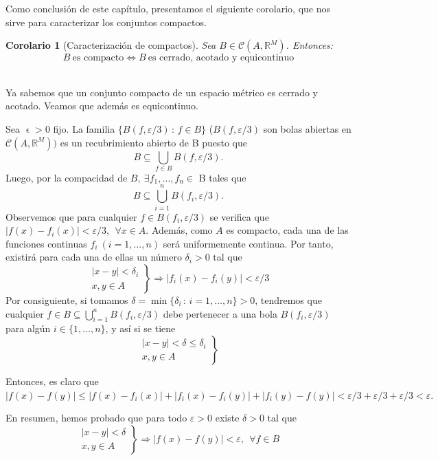 \documentclass[11pt, a4paper]{article}
\makeatletter
\newif\IfInSansMode
\let\oldsf\sffamily
\renewcommand*{\sffamily}{\oldsf\mathversion{sans}\InSansModetrue}
\let\oldnorm\normalfont
\renewcommand*{\normalfont}{\oldnorm\InSansModefalse\mathversion{normal}}
\let\epsilon\upvarepsilon
\renewenvironment{proof}[1][\proofname] {\par\pushQED{\qed}\normalfont\topsep6\p@\@plus6\p@\relax\trivlist\item[\hskip\labelsep\itshape\sffamily#1\@addpunct{.}]\ignorespaces}{\popQED\endtrivlist\@endpefalse}
\theoremstyle{theorem-style}
\newtheorem{ncor}{Corolario}[section]
\theoremstyle{definition-style}
\theoremstyle{remark-style}
\theoremstyle{example-style}
\makeatother
\begin{document}
Como conclusión de este capítulo, presentamos el siguiente corolario, que nos sirve para caracterizar los conjuntos compactos.

\begin{ncor}[Caracterización de compactos] Sea $B \in \mathcal{C}(A,\mathbb{R}^M)$. Entonces: $$B\ \text{es compacto} \iff B \ \text{es cerrado, acotado y equicontinuo}$$
\end{ncor}

  \begin{proof} \hfill \\
    \boxed{\Rightarrow} Ya sabemos que un conjunto compacto de un espacio métrico es cerrado y acotado. Veamos que además es equicontinuo.
    
    Sea $\epsilon >0$ fijo. La familia $\{ B(f, \varepsilon/3) \, : \, f\in B\}$ ($B(f, \varepsilon/3)$ son bolas abiertas en $\mathcal{C}(A, \mathbb{R}^M))$ es un recubrimiento abierto de B puesto que $$B\subseteq \bigcup_{f\in B} B(f, \varepsilon/3).$$
    Luego, por la compacidad de $B,\ \exists f_1, \dots, f_n \in$ B tales que $$B \subseteq \displaystyle \bigcup_{i=1}^n B(f_i, \varepsilon/3).$$
    Observemos que para cualquier $f\in B(f_i, \varepsilon/3)$ se verifica que
    $|f(x)-f_i(x)| < \varepsilon/3 , \ \ \forall x\in A$. Además, como $A$ es compacto, cada una de las funciones continuas $f_i \ (i=1,\dots,n)$ será uniformemente continua. Por tanto, existirá para cada una de ellas un número $\delta_i>0$ tal que $$\left. \begin{array}{c} |x-y|<\delta_i \\ x,y\in A \end{array}  \right\} \Rightarrow |f_i(x)-f_i(y)| <\varepsilon/3$$
    Por consiguiente, si tomamos $\delta = \min \{\delta_i \, :\, i=1,\dots,n\} >0$, tendremos que cualquier $f\in B \subseteq \bigcup_{i=1}^n B(f_i, \varepsilon/3)$ debe pertenecer a una bola $B(f_i, \varepsilon/3)$ para algún $i\in\{1,\dots ,n\}$, y así si se tiene $$\left. \begin{array}{c} |x-y|<\delta \leq \delta_i \\ x,y\in A \end{array}  \right\}$$ 

    Entonces, es claro que $\displaystyle |f(x)-f(y)| \le |f(x)-f_i(x)|+|f_i(x)-f_i(y)|+|f_i(y)-f(y)| < \varepsilon/3+\varepsilon/3+\varepsilon/3<\varepsilon.$

    En resumen, hemos probado que para todo $\varepsilon >0$ existe $\delta >0$ tal que $$ \left. \begin{array}{c} |x-y|<\delta  \\ x,y\in A \end{array}  \right\} \Rightarrow |f(x)-f(y)| <\varepsilon , \ \ \forall f\in B$$


\end{proof}
\end{document}
